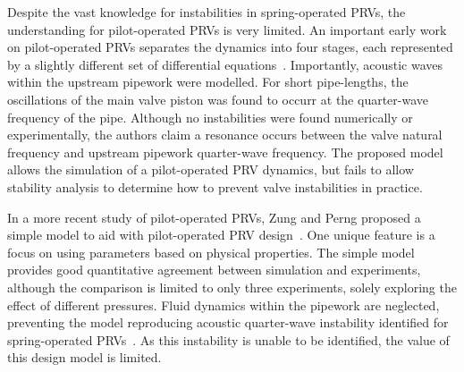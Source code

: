 Despite the vast knowledge for instabilities in spring-operated PRVs, the understanding for pilot-operated PRVs is very limited. An important early work on pilot-operated PRVs separates the dynamics into four stages, each represented by a slightly different set of differential equations~\cite{Botros1997Riser-ReliefInteractions}.
Importantly, acoustic waves within the upstream pipework were modelled.
For short pipe-lengths, the oscillations of the main valve piston was found to occurr at the quarter-wave frequency of the pipe. Although no instabilities were found numerically or experimentally, the authors claim a resonance occurs between the valve natural frequency and upstream pipework quarter-wave frequency. %
The proposed model allows the simulation of a pilot-operated PRV dynamics, but fails to allow stability analysis to determine how to prevent valve instabilities in practice.

In a more recent study of pilot-operated PRVs, Zung and Perng proposed a simple model to aid with pilot-operated PRV design~\cite{Zung2002NonlinearDesigners}. One unique feature is a focus on using parameters based on physical properties.
The simple model provides good quantitative agreement between simulation and experiments, although the comparison is limited to only three experiments, solely exploring the effect of different pressures. Fluid dynamics within the pipework are neglected, preventing the model reproducing acoustic quarter-wave instability identified for spring-operated PRVs~\cite{Hos2017DynamicRecommendations}. As this instability is unable to be identified, the value of this design model is limited.

